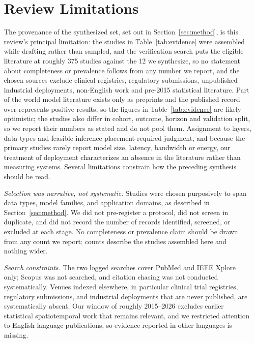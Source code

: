\documentclass[journal]{IEEEtran}
\newif\ifsubmission
\begin{document}
\section{Review Limitations}
\label{sec:limitations}
\ifsubmission
The provenance of the synthesized set, set out in Section~\ref{sec:method}, is this review's principal limitation: the studies in Table~\ref{tab:evidence} were assembled while drafting rather than sampled, and the verification search puts the eligible literature at roughly 375 studies against the 12 we synthesize, so no statement about completeness or prevalence follows from any number we report, and the chosen sources exclude clinical registries, regulatory submissions, unpublished industrial deployments, non-English work and pre-2015 statistical literature. Part of the world model literature exists only as preprints and the published record over-represents positive results, so the figures in Table~\ref{tab:evidence} are likely optimistic; the studies also differ in cohort, outcome, horizon and validation split, so we report their numbers as stated and do not pool them. Assignment to layers, data types and feasible inference placement required judgment, and because the primary studies rarely report model size, latency, bandwidth or energy, our treatment of deployment characterizes an absence in the literature rather than measuring systems.
\else
Several limitations constrain how the preceding synthesis should be read.

\emph{Selection was narrative, not systematic.} Studies were chosen purposively to span data types, model families, and application domains, as described in Section~\ref{sec:method}. We did not pre-register a protocol, did not screen in duplicate, and did not record the number of records identified, screened, or excluded at each stage. No completeness or prevalence claim should be drawn from any count we report; counts describe the studies assembled here and nothing wider.

\emph{Search constraints.} The two logged searches cover PubMed and IEEE Xplore only; Scopus was not searched, and citation chasing was not conducted systematically. Venues indexed elsewhere, in particular clinical trial registries, regulatory submissions, and industrial deployments that are never published, are systematically absent. Our window of roughly 2015--2026 excludes earlier statistical spatiotemporal work that remains relevant, and we restricted attention to English language publications, so evidence reported in other languages is missing.
\end{document}
